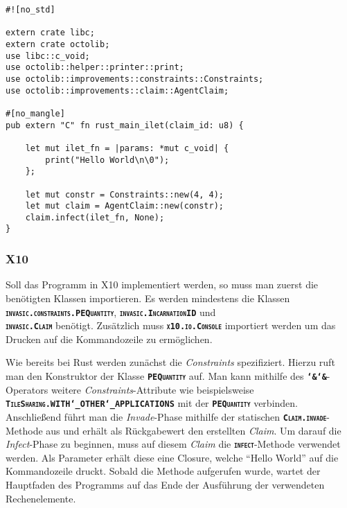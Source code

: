 \lstset{basicstyle=\small}
\begin{lstlisting}[float,caption={Minimales Invade, Infect, Retreat in Rust},label=code:rust_minimal_infect]
#![no_std]

extern crate libc;
extern crate octolib;
use libc::c_void;
use octolib::helper::printer::print;
use octolib::improvements::constraints::Constraints;
use octolib::improvements::claim::AgentClaim;

#[no_mangle]
pub extern "C" fn rust_main_ilet(claim_id: u8) {

    let mut ilet_fn = |params: *mut c_void| {
        print("Hello World\n\0");
    };
    
    let mut constr = Constraints::new(4, 4);
    let mut claim = AgentClaim::new(constr);
    claim.infect(ilet_fn, None);
}
\end{lstlisting}
\lstset{basicstyle=\normalsize}

\subsubsection{X10}

Soll das Programm in X10 implementiert werden, so muss man zuerst die benötigten Klassen importieren. Es werden 
mindestens die Klassen \\
\texttt{\textsc{\textbf{invasic.constraints.PEQuantity}}},
\texttt{\textsc{\textbf{invasic.IncarnationID}}} und \\
\texttt{\textsc{\textbf{invasic.Claim}}}
benötigt. Zusätzlich muss \texttt{\textsc{\textbf{x10.io.Console}}} importiert werden
um das Drucken auf die Kommandozeile zu ermöglichen.

Wie bereits bei Rust werden zunächst die \textit{Constraints} spezifiziert. Hierzu
ruft man den Konstruktor der Klasse \texttt{\textsc{\textbf{PEQuantity}}} auf. Man kann mithilfe
des \texttt{\textsc{\textbf{\char`&\char`&}}}-Operators weitere \textit{Constraints}-Attribute wie beispielsweise \\
\texttt{\textsc{\textbf{TileSharing.WITH\char`_OTHER\char`_APPLICATIONS}}} mit der
\texttt{\textsc{\textbf{PEQuantity}}} verbinden.
Anschließend führt man die \textit{Invade}-Phase mithilfe der statischen
\texttt{\textsc{\textbf{Claim.invade}}}-Methode aus und erhält als Rückgabewert den erstellten \textit{Claim}.
Um darauf die \textit{Infect}-Phase zu beginnen, muss auf diesem \textit{Claim} die
\texttt{\textsc{\textbf{infect}}}-Methode verwendet werden.
Als Parameter erhält diese eine Closure, welche "`Hello World"' auf die Kommandozeile druckt.
Sobald die Methode aufgerufen wurde, wartet der Hauptfaden des Programms auf das Ende der Ausführung der
verwendeten Rechenelemente.

